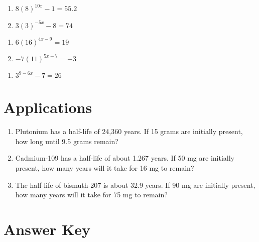 \begin{multicols}{2}
\begin{enumerate}	\setcounter{enumi}{\value{Review}}
	\item $8(8)^{10x}-1 = 55.2$
	\item $3(3)^{-5x}-8=74$
\end{enumerate} \setcounter{Review}{\value{enumi}}
\end{multicols}
\begin{multicols}{2}
\begin{enumerate}	\setcounter{enumi}{\value{Review}}
	\item $6(16)^{4x-9} = 19$
	\item $-7(11)^{5x-7}=-3$
\end{enumerate} \setcounter{Review}{\value{enumi}}
\end{multicols}
\begin{multicols}{2}
\begin{enumerate}	\setcounter{enumi}{\value{Review}}
	\item $3^{9-6x}-7 = 26$
\end{enumerate}
\end{multicols}

\section{Applications}
\begin{enumerate}
	\item Plutonium has a half-life of 24,360 years. If 15 grams are initially present, how long until 9.5 grams remain?
	\item Cadmium-109 has a half-life of about 1.267 years. If 50 mg are initially present, how many years will it take for 16 mg to remain?
    \item The half-life of bismuth-207 is about 32.9 years. If 90 mg are initially present, how many years will it take for 75 mg to remain?
\end{enumerate}

\newpage

\section{Answer Key}

